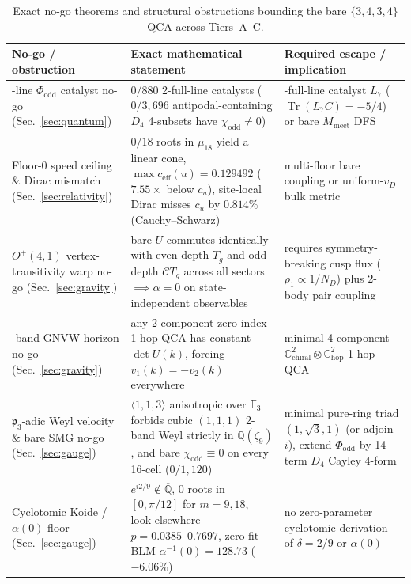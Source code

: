 \begin{table}[htbp]
\centering
\caption{Exact no-go theorems and structural obstructions bounding the bare $\{3,4,3,4\}$ QCA across Tiers~A--C.}
\label{tab:nogo-summary}
\footnotesize
\begin{tabularx}{\textwidth}{@{}>{\raggedright\arraybackslash}p{3.0cm}>{\raggedright\arraybackslash\hsize=1.18\hsize}X>{\raggedright\arraybackslash\hsize=0.82\hsize}X@{}}
\toprule
No-go / obstruction & Exact mathematical statement & Required escape / implication \\
\midrule
2-line $\Phi_{\mathrm{odd}}$ catalyst no-go (Sec.~\ref{sec:quantum}) & $0/880$ 2-full-line catalysts ($0/3{,}696$ antipodal-containing $D_4$ 4-subsets have $\chi_{\mathrm{odd}} \neq 0$) & 3-full-line catalyst $L_7$ ($\operatorname{Tr}(L_7 C) = -5/4$) or bare $M_{\mathrm{meet}}$ DFS \\
\addlinespace[3pt]
Floor-0 speed ceiling \& Dirac mismatch (Sec.~\ref{sec:relativity}) & $0/18$ roots in $\mu_{18}$ yield a linear cone, $\max c_{\mathrm{eff}}(u) = 0.129492$ ($7.55\times$ below $c_u$), site-local Dirac misses $c_u$ by $0.814\%$ (Cauchy--Schwarz) & multi-floor bare coupling or uniform-$v_D$ bulk metric \\
\addlinespace[3pt]
$O^+(4,1)$ vertex-transitivity warp no-go (Sec.~\ref{sec:gravity}) & bare $U$ commutes identically with even-depth $T_g$ and odd-depth $\mathcal{C} T_g$ across all sectors $\implies \alpha = 0$ on state-independent observables & requires symmetry-breaking cusp flux ($\rho_1 \propto 1/N_D$) plus 2-body pair coupling \\
\addlinespace[3pt]
2-band GNVW horizon no-go (Sec.~\ref{sec:gravity}) & any 2-component zero-index 1-hop QCA has constant $\det U(k)$, forcing $v_1(k) = -v_2(k)$ everywhere & minimal 4-component $\mathbb{C}^2_{\mathrm{chiral}} \otimes \mathbb{C}^2_{\mathrm{hop}}$ 1-hop QCA \\
\addlinespace[3pt]
$\mathfrak{p}_3$-adic Weyl velocity \& bare SMG no-go (Sec.~\ref{sec:gauge}) & $\langle 1,1,3 \rangle$ anisotropic over $\mathbb{F}_3$ forbids cubic $(1,1,1)$ 2-band Weyl strictly in $\mathbb{Q}(\zeta_9)$, and bare $\chi_{\mathrm{odd}} \equiv 0$ on every 16-cell ($0/1{,}120$) & minimal pure-ring triad $(1,\sqrt{3},1)$ (or adjoin $i$), extend $\Phi_{\mathrm{odd}}$ by 14-term $D_4$ Cayley 4-form \\
\addlinespace[3pt]
Cyclotomic Koide / $\alpha(0)$ floor (Sec.~\ref{sec:gauge}) & $e^{i2/9} \notin \overline{\mathbb{Q}}$, $0$ roots in $[0,\pi/12]$ for $m = 9, 18$, look-elsewhere $p = 0.0385\text{--}0.7697$, zero-fit BLM $\alpha^{-1}(0) = 128.73$ ($-6.06\%$) & no zero-parameter cyclotomic derivation of $\delta = 2/9$ or $\alpha(0)$ \\
\bottomrule
\end{tabularx}
\end{table}

